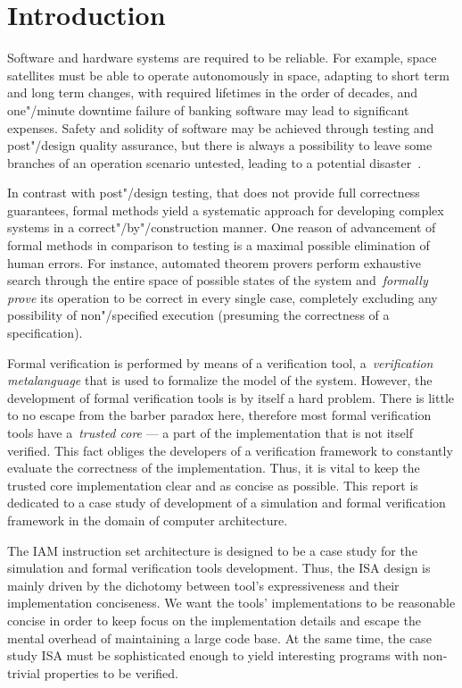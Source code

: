 \section{Introduction}

Software and hardware systems are required to be reliable.
For example, space satellites must be able to operate autonomously in space,
adapting to short term and long term changes,
with required lifetimes in the order of decades,
and one"/minute downtime failure of banking software may lead to significant expenses.
Safety and solidity of software may be achieved through testing and post"/design quality
assurance, but there is always a possibility to leave some branches of an operation
scenario untested, leading to a potential disaster~\cite{Leveson2004}.

In contrast with post"/design testing, that does not provide full
correctness guarantees, formal methods yield a systematic approach for developing
complex systems in a correct"/by"/construction manner. One reason of advancement of
formal methods in comparison to testing is a maximal possible elimination of human errors.
For instance, automated theorem provers perform exhaustive search
through the entire space of possible states of the system and~\emph{formally prove} its
operation to be correct in every single case, completely excluding any possibility of
non"/specified execution (presuming the correctness of a specification).

Formal verification is performed by means of a verification tool,
a~\emph{verification metalanguage} that is used to formalize the model of the system.
However, the development of formal verification tools is by itself a hard problem.
There is little to no escape from the barber paradox here, therefore most formal
verification tools have a~\emph{trusted core} --- a part of the implementation that
is not itself verified. This fact obliges the developers of a verification framework
to constantly evaluate the correctness of the implementation. Thus, it is vital
to keep the trusted core implementation clear and as concise as possible. This report
is dedicated to a case study of development of a simulation and formal verification
framework in the domain of computer architecture.

The IAM instruction set architecture is designed to be a case study for
the simulation and formal verification tools development. Thus, the ISA design
is mainly driven by the dichotomy between tool's expressiveness and their
implementation conciseness.
We want the tools' implementations to be reasonable concise in order to keep
focus on the implementation details and escape the mental overhead of maintaining a large
code base. At the same time, the case study ISA must be sophisticated enough to
yield interesting programs with non-trivial properties to be verified.

